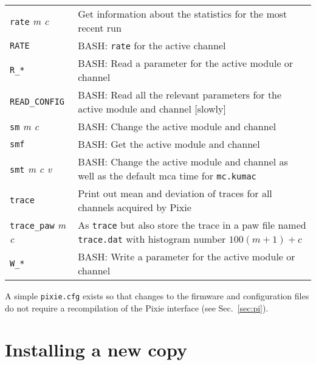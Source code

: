 \documentclass{article}
\begin{document}
\begin{table}[htp]
\begin{tabular}{l p{3in}}
\texttt{rate} {\it m c} & Get information about the statistics for the most recent run \\
\texttt{RATE} & \textsc{BASH:} \texttt{rate} for the active channel \\
\texttt{R\_*} & \textsc{BASH:} Read a parameter for the active module or channel \\
\texttt{READ\_CONFIG} & \textsc{BASH:} Read all the relevant parameters for the active module and channel [slowly] \\
\texttt{sm} {\it m c} & \textsc{BASH:} Change the active module and channel \\
\texttt{smf} & \textsc{BASH:} Get the active module and channel \\
\texttt{smt} {\it m c v} & \textsc{BASH:} Change the active module and channel as well as the default mca time for \texttt{mc.kumac} \\
\texttt{trace} & Print out mean and deviation of traces for all channels acquired by Pixie \\
\texttt{trace\_paw} {\it m c} & As \texttt{trace} but also store the trace in a paw file named \texttt{trace.dat} with histogram number $100(m+1) + c$ \\
\texttt{W\_*} & \textsc{BASH:} Write a parameter for the active module or channel \\
\end{tabular}
\end{table}
A simple \texttt{pixie.cfg} exists so that changes to the firmware and configuration files do not require a recompilation of the Pixie interface (see Sec.~\ref{sec:pi}).
\section{\label{sec:install}Installing a new copy}
\end{document}
